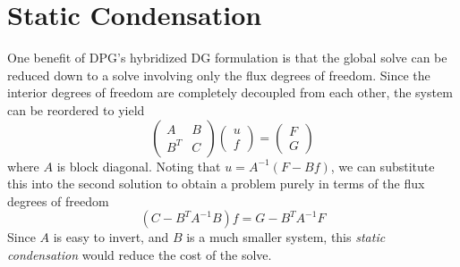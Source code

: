 \documentclass{article}
\begin{document}



\newpage
\appendix
\section{Static Condensation}\label{app:staticCondensation}

One benefit of DPG's hybridized DG formulation is that the global solve can be reduced down to a solve involving only the flux degrees of freedom. Since the interior degrees of freedom are completely decoupled from each other, the system can be reordered to yield 
\[
\left(\begin{array}{cc}
A &B\\
B^T &C
\end{array}
\right)
\left(\begin{array}{c}
u\\
f
\end{array}
\right) = 
\left(\begin{array}{c}
F\\
G
\end{array}
\right)
\]
where $A$ is block diagonal. Noting that $u = A^{-1}(F-Bf)$, we can substitute this into the second solution to obtain a problem purely in terms of the flux degrees of freedom
\[
(C-B^TA^{-1}B)f = G-B^TA^{-1}F
\]
Since $A$ is easy to invert, and $B$ is a much smaller system, this \emph{static condensation} would reduce the cost of the solve.
\end{document}

